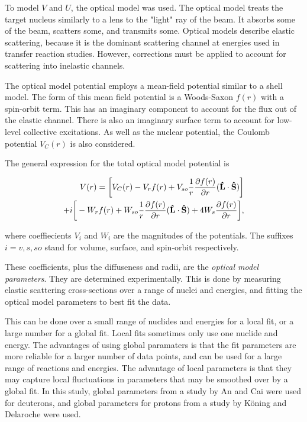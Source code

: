 To model $V$ and $U$, the optical model was used. The optical model treats the target nucleus similarly to a lens to the "light" ray of the beam. It absorbs some of the beam, scatters some, and transmits some. Optical models describe elastic scattering, because it is the dominant scattering channel at energies used in transfer reaction studies. However, corrections must be applied to account for scattering into inelastic channels.

The optical model potential employs a mean-field potential similar to a shell model. The form of this mean field potential is a Woods-Saxon $f(r)$ with a spin-orbit term. This has an imaginary component to account for the flux out of the elastic channel. There is also an imaginary surface term to account for  low-level collective excitations. As well as the nuclear potential, the Coulomb potential $V_C(r)$ is also considered.

The general expression for the total optical model potential is

\begin{equation}
\begin{split}
V(r) = \bigg [ V_C(r) - V_rf(r) + V_{so}\frac{1}{r}\frac{\partial f(r)}{\partial r}({\bf \hat{L} \cdot \hat{S}}) \bigg ] \\
	+ i \bigg [ -W_rf(r) + W_{so}\frac{1}{r}\frac{\partial f(r)}{\partial r}({\bf \hat{L} \cdot \hat{S}}) + 4W_s \frac{\partial f(r)}{\partial r} \bigg ] \mathrm{,}
\end{split}
\end{equation}

where coeffiecients $V_i$ and $W_i$ are the magnitudes of the potentials. The suffixes $i =  v, s, so$ stand for volume, surface, and spin-orbit respectively.

These coefficients, plus the diffuseness and radii, are the \textit{optical model parameters}. They are determined experimentally. This is done by measuring elastic scattering cross-sections over a range of nuclei and energies, and fitting  the optical model parameters to best fit the data.

This can be done over a small range of nuclides and energies for a local fit, or a large number for a global fit. Local fits sometimes only use one nuclide and energy. The advantages of using global paramaters is that the fit parameters are more reliable for a larger number of data points, and can be used for a large range of reactions and energies. The advantage of local parameters is that they may capture local fluctuations in parameters that may be smoothed over by a global fit. In this study, global parameters from a study by An and Cai\cite{ancai} were used for deuterons, and global parameters for protons from a study by K\"oning and Delaroche\cite{koningdelaroche} were used.


